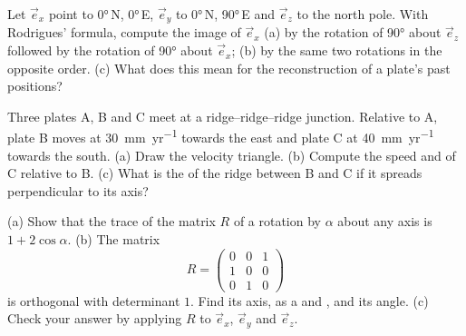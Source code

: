 \begin{exercise}[$\star\star$]\label{exo:b1:plate-kinematics:8}
Let $\vec e_x$ point to \ang{0}\,N, \ang{0}\,E, $\vec e_y$ to \ang{0}\,N,
\ang{90}\,E and $\vec e_z$ to the north pole. With Rodrigues' formula, compute
the image of $\vec e_x$ (a) by the rotation of \ang{90} about $\vec e_z$
followed by the rotation of \ang{90} about $\vec e_x$; (b) by the same two
rotations in the opposite order. (c) What does this mean for the
reconstruction of a plate's past positions?
\end{exercise}

\begin{exercise}[$\star\star$]\label{exo:b1:plate-kinematics:9}
Three plates A, B and C meet at a ridge--ridge--ridge junction. Relative to A,
plate B moves at \qty{30}{mm.yr^{-1}} towards the east and plate C at
\qty{40}{mm.yr^{-1}} towards the south. (a) Draw the velocity triangle.
(b) Compute the speed and  of C relative to B. (c) What is the  of
the ridge between B and C if it spreads perpendicular to its axis?
\end{exercise}

\begin{exercise}[$\star\star\star$]\label{exo:b1:plate-kinematics:10}
(a) Show that the trace of the matrix $R$ of a rotation by $\alpha$ about any
axis is $1 + 2\cos\alpha$. (b) The matrix
\[
  R = \begin{pmatrix} 0 & 0 & 1\\ 1 & 0 & 0\\ 0 & 1 & 0\end{pmatrix}
\]
is orthogonal with determinant $1$. Find its axis, as a  and ,
and its angle. (c) Check your answer by applying $R$ to $\vec e_x$, $\vec e_y$
and $\vec e_z$.
\end{exercise}

